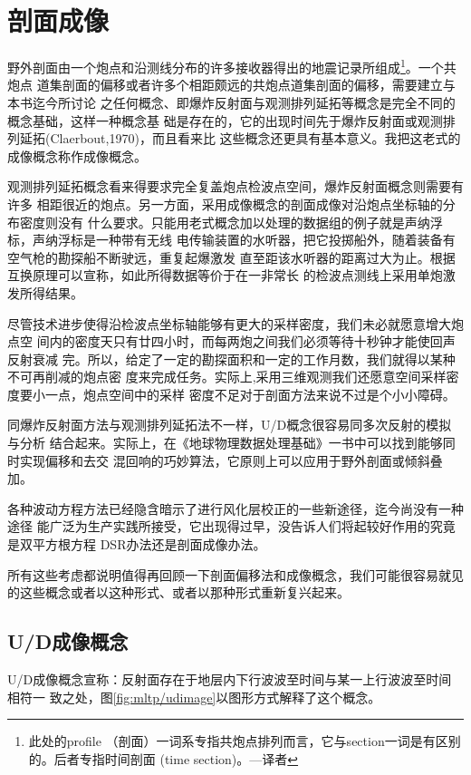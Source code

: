 \section{剖面成像}
\label{sec:5.7}

野外剖面由一个炮点和沿测线分布的许多接收器得出的地震记录所组成\footnote{
此处的profile
（剖面）一词系专指共炮点排列而言，它与section一词是有区别的。后者专指时间剖面
(time section)。---译者
}。一个共炮点
道集剖面的偏移或者许多个相距颇远的共炮点道集剖面的偏移，需要建立与本书迄今所讨论
之任何概念、即爆炸反射面与观测排列延拓等概念是完全不同的概念基础，这样一种概念基
础是存在的，它的出现时间先于爆炸反射面或观测排列延拓(Claerbout,1970)，而且看来比
这些概念还更具有基本意义。我把这老式的成像概念称作成像概念。

观测排列延拓概念看来得要求完全复盖炮点检波点空间，爆炸反射面概念则需要有许多
相距很近的炮点。另一方面，采用成像概念的剖面成像对沿炮点坐标轴的分布密度则没有
什么要求。只能用老式概念加以处理的数据组的例子就是声纳浮标，声纳浮标是一种带有无线
电传输装置的水听器，把它投掷船外，随着装备有空气枪的勘探船不断驶远，重复起爆激发
直至距该水听器的距离过大为止。根据互换原理可以宣称，如此所得数据等价于在一非常长
的检波点测线上采用单炮激发所得结果。

尽管技术进步使得沿检波点坐标轴能够有更大的采样密度，我们未必就愿意增大炮点空
间内的密度天只有廿四小时，而每两炮之间我们必须等待十秒钟才能使回声反射衰减
完。所以，给定了一定的勘探面积和一定的工作月数，我们就得以某种不可再削减的炮点密
度来完成任务。实际上,采用三维观测我们还愿意空间采样密度要小一点，炮点空间中的采样
密度不足对于剖面方法来说不过是个小小障碍。

同爆炸反射面方法与观测排列延拓法不一样，U/D概念很容易同多次反射的模拟与分析
结合起来。实际上，在《地球物理数据处理基础》一书中可以找到能够同时实现偏移和去交
混回响的巧妙算法，它原则上可以应用于野外剖面或倾斜叠加。

各种波动方程方法已经隐含暗示了进行风化层校正的一些新途径，迄今尚没有一种途径
能广泛为生产实践所接受，它出现得过早，没告诉人们将起较好作用的究竟是双平方根方程
DSR办法还是剖面成像办法。

所有这些考虑都说明值得再回顾一下剖面偏移法和成像概念，我们可能很容易就见
的这些概念或者以这种形式、或者以那种形式重新复兴起来。

\subsection{U/D成像概念}
\label{sec:5.7.1}

U/D成像概念宣称：反射面存在于地层内下行波波至时间与某一上行波波至时间相符一
致之处，图\ref{fig:mltp/udimage}以图形方式解释了这个概念。

